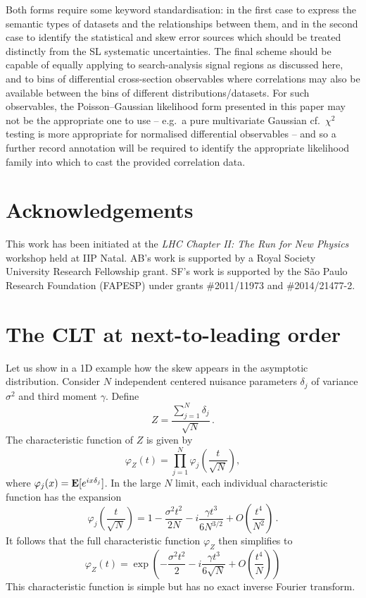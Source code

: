 \documentclass[11pt]{article}
\newcommand{\be}{\begin{equation}}
\newcommand{\ee}{\end{equation}}
\begin{document}
Both forms require some keyword standardisation: in the first case to express
the semantic types of datasets and the relationships between them, and in the
second case to identify the statistical and skew error sources which should be
treated distinctly from the SL systematic uncertainties. The final scheme should
be capable of equally applying to search-analysis signal regions as discussed
here, and to bins of differential cross-section observables where correlations
may also be available between the bins of different distributions/datasets.  For
such observables, the Poisson--Gaussian likelihood form presented in this paper
may not be the appropriate one to use -- e.g.~a pure multivariate Gaussian
cf.~$\chi^2$ testing is more appropriate for normalised differential observables
-- and so a further record annotation will be required to identify the
appropriate likelihood family into which to cast the provided correlation data.


\section*{Acknowledgements}

 This work has been initiated at the \textit{LHC Chapter II: The Run for New Physics} workshop held at IIP Natal.
 AB's work is supported by a Royal Society University Research Fellowship grant.
 SF's work is supported by the S\~ao Paulo Research Foundation (FAPESP) under grants \#2011/11973 and \#2014/21477-2.


\appendix

\section{The CLT at next-to-leading order}
\label{app:skew}




Let us show in a 1D example how the skew appears  in the asymptotic distribution. Consider $N$ independent centered nuisance parameters $\delta_j$ of variance $\sigma^2$ and third moment $\gamma$. Define \be Z=\frac{\sum_{j=1}^N \delta_j}{\sqrt{N}}\,.
\ee
The characteristic function of $Z$ is given by
\be
\varphi_Z(t)=\prod_{j=1}^N\varphi_{j}\left(\frac{t}{\sqrt{N}}\right),
\ee
where $\varphi_{j}(x) = {\bf E}[e^{ix\delta_{j}}]$.
 In the large $N$ limit, each individual characteristic function has the expansion
\be
\varphi_{j}\left(\frac{t}{\sqrt{N}}\right)= 1-\frac{\sigma^2 t^2}{2N}-i \frac{\gamma t^3}{6 N^{3/2}} +O\left(\frac{t^4}{N^2}\right)\,.
\ee
It follows that the full characteristic function $\varphi_Z$ then simplifies to
\be
\varphi_Z(t)=\exp\left(-\frac{\sigma^2 t^2}{2}-i \frac{\gamma t^3}{6 \sqrt{N}} +O\left(\frac{t^4}{N}\right)\right) \label{eq:CF_CLT}
 \ee
 This characteristic function is simple but has no exact inverse Fourier transform.
\end{document}
